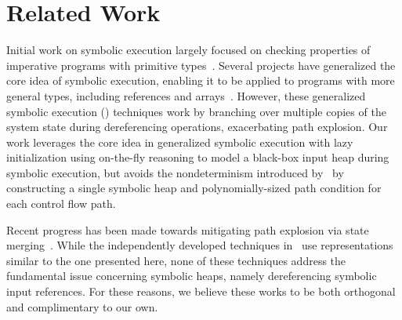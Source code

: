 \section{Related Work}
\label{sec:related}

Initial work on symbolic execution largely focused on checking
properties of imperative programs with primitive
types~\cite{Clarke:76,King:76}.
Several projects have generalized the core idea of symbolic execution,
enabling it to be applied to programs with more general types,
including references and
arrays~\cite{GSE03,KiasanKunit,Cadar:2008,Rosner:2015}. However, these
generalized symbolic execution (\gsetxt{}) techniques work by branching over
multiple copies of the system state during dereferencing operations,
exacerbating path explosion.
Our work leverages the core idea in generalized symbolic execution
with lazy initialization using on-the-fly reasoning to model a
black-box input heap during symbolic execution, but avoids the
nondeterminism introduced by~\gsetxt{} by constructing a single
symbolic heap and polynomially-sized path condition for each control
flow path.

Recent progress has been made towards mitigating path explosion via state merging~\cite{Kuznetsov:2012,Sen:2014,Torlak:2014}. While the independently developed techniques in~\cite{Sen:2014,Torlak:2014} use representations similar to the one presented here, none of these techniques address the fundamental issue concerning symbolic heaps, namely dereferencing symbolic input references. For these reasons, we believe these works to be both orthogonal and complimentary to our own.


